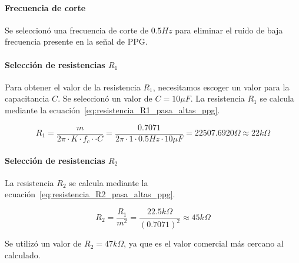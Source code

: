         \paragraph{Frecuencia de corte}
        Se seleccionó una frecuencia de corte de $0.5 Hz$ para eliminar el ruido de baja frecuencia presente en la señal de PPG.

        \paragraph{Selección de resistencias $R_1$}
        Para obtener el valor de la resistencia $R_1$, necesitamos escoger un valor para la capacitancia $C$. Se seleccionó un valor de $C = 10 \mu F$. La resistencia $R_1$ se calcula mediante la ecuación~\ref{eq:resistencia_R1_pasa_altas_ppg}.

        \begin{equation}
            \label{eq:resistencia_R1_pasa_altas_ppg}
            R_1 = \frac{m}{2\pi \cdot K \cdot f_c \cdot \cdot C} = \frac{0.7071}{2\pi \cdot 1 \cdot 0.5 Hz \cdot 10 \mu F} = 22507.6920 \Omega \approx 22 k\Omega
        \end{equation}

        \paragraph{Selección de resistencias $R_2$}
        La resistencia $R_2$ se calcula mediante la ecuación~\ref{eq:resistencia_R2_pasa_altas_ppg}.

        \begin{equation}
            \label{eq:resistencia_R2_pasa_altas_ppg}
            R_2 = \frac{R_1}{m^2} = \frac{22.5 k\Omega}{(0.7071)^2} \approx 45 k\Omega
        \end{equation}

        Se utilizó un valor de $R_2 = 47 k\Omega$, ya que es el valor comercial más cercano al calculado.


